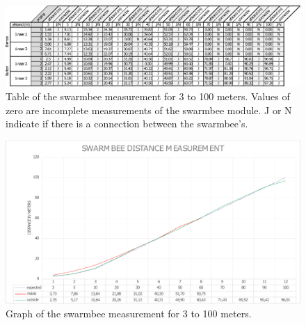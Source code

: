 \documentclass[10pt,a4paper]{article}
\begin{document}
\begin{figure}[H]
  \centering
      \includegraphics[width=\textwidth]{swarmbeemeasurement}
  \caption{Table of the swarmbee measurement for 3 to 100 meters. Values of zero are incomplete measurements of the swarmbee module. J or N indicate if there is a connection between the swarmbee's.}
  \label{swarmbeemeasurement}
\end{figure}



\begin{figure}[H]
  \centering
      \includegraphics[width=\textwidth]{swarmbeegraph}
  \caption{Graph of the swarmbee measurement for 3 to 100 meters.}
  \label{swarmbeegraph}
\end{figure}
\end{document}
